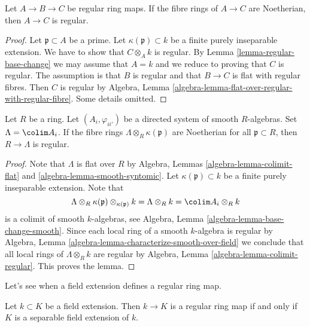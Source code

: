 \begin{lemma}
\label{lemma-regular-composition}
Let $A \to B \to C$ be regular ring maps.
If the fibre rings of $A \to C$ are Noetherian, then
$A \to C$ is regular.
\end{lemma}

\begin{proof}
Let $\mathfrak p \subset A$ be a prime. Let $\kappa(\mathfrak p) \subset k$
be a finite purely inseparable extension. We have to show that
$C \otimes_A k$ is regular. By Lemma \ref{lemma-regular-base-change}
we may assume that $A = k$ and we reduce to proving that $C$ is regular.
The assumption is that $B$ is regular and that $B \to C$ is flat
with regular fibres. Then $C$ is regular by Algebra, Lemma
\ref{algebra-lemma-flat-over-regular-with-regular-fibre}.
Some details omitted.
\end{proof}

\begin{lemma}
\label{lemma-colimit-smooth-regular}
Let $R$ be a ring. Let $(A_i, \varphi_{ii'})$ be a directed system
of smooth $R$-algebras. Set $\Lambda = \colim A_i$. If the fibre
rings $\Lambda \otimes_R \kappa(\mathfrak p)$ are Noetherian for all
$\mathfrak p \subset R$, then $R \to \Lambda$ is regular.
\end{lemma}

\begin{proof}
Note that $\Lambda$ is flat over $R$ by
Algebra, Lemmas \ref{algebra-lemma-colimit-flat} and
\ref{algebra-lemma-smooth-syntomic}.
Let $\kappa(\mathfrak p) \subset k$ be a finite purely inseparable
extension. Note that
$$
\Lambda \otimes_R \kappa(\mathfrak p) \otimes_{\kappa(\mathfrak p)} k =
\Lambda \otimes_R k = \colim A_i \otimes_R k
$$
is a colimit of smooth $k$-algebras, see
Algebra, Lemma \ref{algebra-lemma-base-change-smooth}.
Since each local ring of a smooth $k$-algebra is regular by
Algebra, Lemma \ref{algebra-lemma-characterize-smooth-over-field}
we conclude that all local rings of $\Lambda \otimes_R k$ are
regular by
Algebra, Lemma \ref{algebra-lemma-colimit-regular}.
This proves the lemma.
\end{proof}

\noindent
Let's see when a field extension defines a regular ring map.

\begin{lemma}
\label{lemma-regular-field-extension}
Let $k \subset K$ be a field extension. Then $k \to K$ is a regular
ring map if and only if $K$ is a separable field extension of $k$.
\end{lemma}

